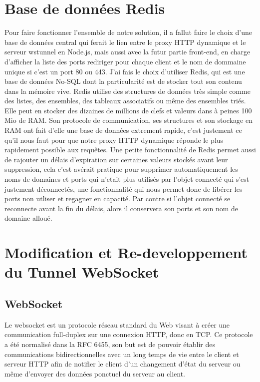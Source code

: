 \section{Base de données Redis}

Pour faire fonctionner l'ensemble de notre solution, il a fallut faire le choix d'une base de données central qui ferait le lien entre le proxy HTTP dynamique et le serveur wstunnel en Node.js, mais aussi avec la futur partie front-end, en charge d'afficher la liste des ports rediriger pour chaque client et le nom de dommaine unique si c'est un port 80 ou 443. J'ai fais le choix d'utiliser Redis, qui est une base de données No-SQL dont la particularité est de stocker tout son contenu dans la mémoire vive. Redis utilise des structures de données très simple comme des listes, des ensembles, des tableaux associatifs ou même des ensembles triés. Elle peut en stocker des dizaines de millions de clefs et valeurs dans à peines 100 Mio de RAM. Son protocole de communication, ses structures et son stockage en RAM ont fait d'elle une base de données extrement rapide, c'est justement ce qu'il nous faut pour que notre proxy HTTP dynamique réponde le plus rapidement possible aux requêtes. Une petite fonctionnalité de Redis permet aussi de rajouter un délais d'expiration sur certaines valeurs stockés avant leur suppression, cela c'est avérait pratique pour supprimer automatiquement les noms de domaines et ports qui n'etait plus utilisés par l'objet connecté qui s'est justement déconnectés, une fonctionnalité qui nous permet donc de libérer les ports non utliser et regagner en capacité. Par contre si l'objet connecté se reconnecte avant la fin du délais, alors il conservera son ports et son nom de domaine alloué.

\section{Modification et Re-developpement du Tunnel WebSocket}

\subsection{WebSocket}

Le websocket est un protocole réseau standard du Web visant à créer une communication full-duplex sur une connexion HTTP, donc en TCP. Ce protocole a été normalisé dans la RFC 6455, son but est de pouvoir établir des communications bidirectionnelles avec un long temps de vie entre le client et serveur HTTP afin de notifier le client d'un changement d'état du serveur ou même d'envoyer des données ponctuel du serveur au client.


